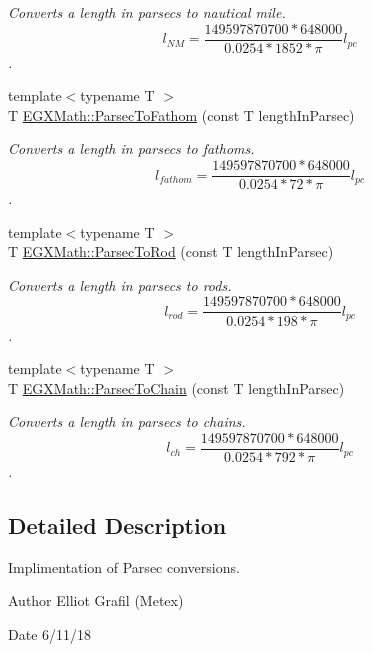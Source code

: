 \begin{DoxyCompactItemize}
\begin{DoxyCompactList}\small\item\em Converts a length in parsecs to nautical mile. \[ l_{NM}= \frac{149597870700 * 648000}{0.0254 * 1852 * \pi} l_{pc} \]. \end{DoxyCompactList}\item 
{\footnotesize template$<$typename T $>$ }\\T \mbox{\hyperlink{group___e_g_x_math-_conversions-_length_conversions-_astronomical-_parsec-_nautical_gab621169a5b3794b8405b4b0bca2b6092}{E\+G\+X\+Math\+::\+Parsec\+To\+Fathom}} (const T length\+In\+Parsec)
\begin{DoxyCompactList}\small\item\em Converts a length in parsecs to fathoms. \[ l_{fathom}= \frac{149597870700 * 648000}{0.0254 * 72 * \pi} l_{pc} \]. \end{DoxyCompactList}\item 
{\footnotesize template$<$typename T $>$ }\\T \mbox{\hyperlink{group___e_g_x_math-_conversions-_length_conversions-_astronomical-_parsec-_surveyors_gae1b8ed339937e1c769e4617dbe1e70e1}{E\+G\+X\+Math\+::\+Parsec\+To\+Rod}} (const T length\+In\+Parsec)
\begin{DoxyCompactList}\small\item\em Converts a length in parsecs to rods. \[ l_{rod}= \frac{149597870700 * 648000}{0.0254 * 198 * \pi} l_{pc} \]. \end{DoxyCompactList}\item 
{\footnotesize template$<$typename T $>$ }\\T \mbox{\hyperlink{group___e_g_x_math-_conversions-_length_conversions-_astronomical-_parsec-_surveyors_gafe4318e1971a50fd899558ca0e9cf7c6}{E\+G\+X\+Math\+::\+Parsec\+To\+Chain}} (const T length\+In\+Parsec)
\begin{DoxyCompactList}\small\item\em Converts a length in parsecs to chains. \[ l_{ch}= \frac{149597870700 * 648000}{0.0254 * 792 * \pi} l_{pc} \]. \end{DoxyCompactList}\end{DoxyCompactItemize}


\subsection{Detailed Description}
Implimentation of Parsec conversions. 

\begin{DoxyAuthor}{Author}
Elliot Grafil (Metex) 
\end{DoxyAuthor}
\begin{DoxyDate}{Date}
6/11/18 
\end{DoxyDate}
